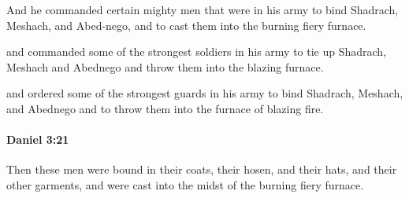 			\begin{versebox}
					\item[BHS] 
					\item[LXX] 
					\item[ASV] And he commanded certain mighty men that were in his army to bind Shadrach, Meshach, and Abed-nego, and to cast them into the burning fiery furnace.
					\item[NIV] and commanded some of the strongest soldiers in his army to tie up Shadrach, Meshach and Abednego and throw them into the blazing furnace.
					\item[NRSV] and ordered some of the strongest guards in his army to bind Shadrach, Meshach, and Abednego and to throw them into the furnace of blazing fire.
			\end{versebox}

		\paragraph{Daniel 3:21} %
			\label{DANIEL-3-21}

			Then these men were bound in their coats, their hosen, and their hats, and their other garments, and were cast into the midst of the burning fiery furnace.


